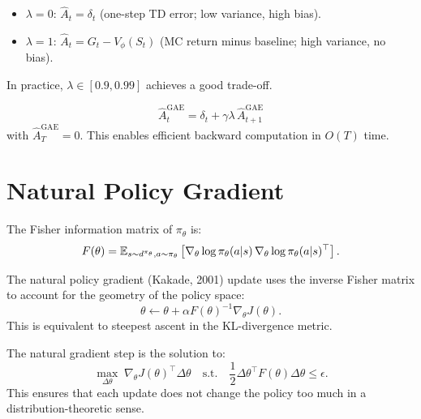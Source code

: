 \begin{proposition}
\begin{itemize}
    \item $\lambda = 0$: $\hat{A}_t = \delta_t$ (one-step TD error;
    low variance, high bias).
    \item $\lambda = 1$: $\hat{A}_t = G_t - V_\phi(S_t)$ (MC return minus
    baseline; high variance, no bias).
\end{itemize}
In practice, $\lambda \in [0.9, 0.99]$ achieves a good trade-off.
\end{proposition}

\begin{keyformulas}[title=\textbf{GAE Recursive Computation}]
\[
    \hat{A}_t^{\text{GAE}} = \delta_t + \gamma \lambda \, \hat{A}_{t+1}^{\text{GAE}}
\]
with $\hat{A}_T^{\text{GAE}} = 0$. This enables efficient backward
computation in $O(T)$ time.
\end{keyformulas}

\section{Natural Policy Gradient}
\label{sec:npg}

\begin{definition}
The Fisher information matrix of $\pi_\theta$ is:
\[
    F(\theta) = \mathbb{E}_{s \sim d^{\pi_\theta}, a \sim \pi_\theta}
    \left[\nabla_\theta \log \pi_\theta(a|s) \,
    \nabla_\theta \log \pi_\theta(a|s)^\top\right].
\]
\end{definition}

\begin{definition}
The natural policy gradient (Kakade, 2001) update uses the inverse Fisher
matrix to account for the geometry of the policy space:
\[
    \theta \leftarrow \theta + \alpha F(\theta)^{-1}
    \nabla_\theta J(\theta).
\]
This is equivalent to steepest ascent in the KL-divergence metric.
\end{definition}

\begin{theorem}
The natural gradient step is the solution to:
\[
    \max_{\Delta\theta} \; \nabla_\theta J(\theta)^\top \Delta\theta
    \quad \text{s.t.} \quad
    \frac{1}{2} \Delta\theta^\top F(\theta) \Delta\theta \leq \epsilon.
\]
This ensures that each update does not change the policy too much in a
distribution-theoretic sense.
\end{theorem}

